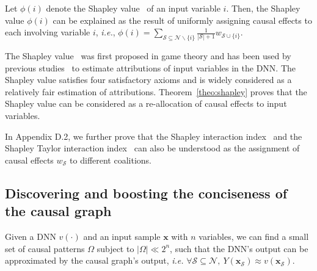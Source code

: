 \documentclass[10pt,twocolumn,letterpaper]{article}
\begin{document}
\begin{theorem}\label{th:harsanyi-shapley-value}
Let {\small $\phi(i)$} denote the Shapley value~\cite{shapley1953value} of an input variable $i$.
Then, the Shapley value {\small$\phi(i)$} can be explained as the result of uniformly assigning causal effects to each involving variable {\small$i$}, \emph{i.e.}, {\small $\phi(i)=\sum_{\mathcal{S}\subseteq \mathcal{N}\backslash\{i\}}\frac{1}{|\mathcal{S}|+1} w_{\mathcal{S}\cup\{i\}}$}.
\label{theo:shapley}
\end{theorem}
The Shapley value~\cite{shapley1953value} was first proposed in game theory and has been used by previous studies~\cite{lundberg2017unified} to estimate attributions of input variables in the DNN. The Shapley value satisfies four satisfactory axioms and is widely considered as a relatively fair estimation of attributions. Theorem~\ref{theo:shapley} proves that the Shapley value can be considered as a re-allocation of causal effects to input variables.

In Appendix D.2, we further prove that the Shapley interaction index~\cite{grabisch1999axiomatic} and the Shapley Taylor interaction index~\cite{sundararajan2020shapley} can also be understood as the assignment of causal effects {\small$w_{\mathcal{S}}$} to different coalitions.


\subsection{Discovering and boosting the conciseness of the causal graph}
\label{subsec:method-boost-concise}

\begin{remark}\label{rem:harsanyi-sparse}
    Given a DNN {\small$v(\cdot)$} and an input sample {\small$\boldsymbol{x}$} with {\small$n$} variables, we can find a small set of causal patterns {\small$\Omega$} subject to {\small$|\Omega|\!\ll\! 2^n$}, such that the DNN's output can be approximated by the causal graph's output, \emph{i.e.} {\small$\forall\mathcal{S}\subseteq\mathcal{N},\ Y(\boldsymbol{x}_{\mathcal{S}})\approx v(\boldsymbol{x}_{\mathcal{S}})$}.
\end{remark}
\vspace{-3pt}
\end{document}
